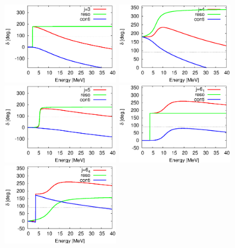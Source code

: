 \documentclass[english,12pt]{jsarticle}
\begin{document}
\begin{figure}
\begin{minipage}{0.6\textwidth}
 \end{minipage}
 \begin{minipage}{0.6\textwidth}
  \includegraphics[width=5cm]{allphs_3.eps}
 \end{minipage}
 \begin{minipage}{0.6\textwidth}
  \includegraphics[width=5cm]{allphs_4.eps}
 \end{minipage}
 \begin{minipage}{0.6\textwidth}
  \includegraphics[width=5cm]{allphs_5.eps}
 \end{minipage}
 \begin{minipage}{0.6\textwidth}
  \includegraphics[width=5cm]{allphs_6_1.eps}
 \end{minipage}
 \begin{minipage}{0.6\textwidth}
  \includegraphics[width=5cm]{allphs_6_4.eps}
 \end{minipage}
 \end{figure}
\end{document}
